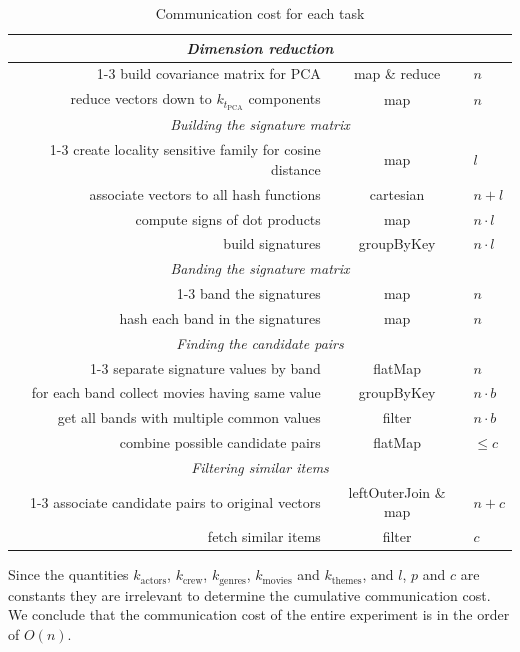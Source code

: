 \begin{table}
\begin{tabularx}{\linewidth}{rcl}
        \multicolumn{3}{c}{\textit{Dimension reduction}} \\
        \cmidrule(lr){1-3} 
        build covariance matrix for PCA & map \& reduce & $n$ \\
        reduce vectors down to $k_{t_\text{PCA}}$ components & map & $n$ \\[4pt]

        \multicolumn{3}{c}{\textit{Building the signature matrix}} \\
        \cmidrule(lr){1-3} 
        create locality sensitive family for cosine distance & map & $l$ \\
        associate vectors to all hash functions & cartesian & $n+l$ \\
        compute signs of dot products & map & $n\cdot l$ \\
        build signatures & groupByKey & $n \cdot l$ \\ [4pt]

        \multicolumn{3}{c}{\textit{Banding the signature matrix}} \\
        \cmidrule(lr){1-3}
        band the signatures & map & $n$ \\
        hash each band in the signatures & map & $n$ \\[4pt]
        
        \multicolumn{3}{c}{\textit{Finding the candidate pairs}} \\
        \cmidrule(lr){1-3} 
        separate signature values by band & flatMap & $n$ \\
        for each band collect movies having same value & groupByKey & $n\cdot b$ \\
        get all bands with multiple common values & filter & $n\cdot b$ \\
        combine possible candidate pairs & flatMap & $\leq c$ \\[4pt]
        
        \multicolumn{3}{c}{\textit{Filtering similar items}} \\
        \cmidrule(lr){1-3}  
        associate candidate pairs to original vectors & leftOuterJoin \& map & $n + c$ \\
        fetch similar items & filter & $c$ \\[4pt]
        \bottomrule
    \end{tabularx}
    \caption{Communication cost for each task}\label{tab:parametriInput}
    \label{tab:communicationCost}
\end{table}

Since the quantities $k_\text{actors}$, $k_\text{crew}$, $k_\text{genres}$, $k_\text{movies}$ and $k_\text{themes}$, and $l$, $p$ and $c$ are constants they are irrelevant to determine the cumulative communication cost. We conclude that the communication cost of the entire experiment is in the order of $O(n)$.
